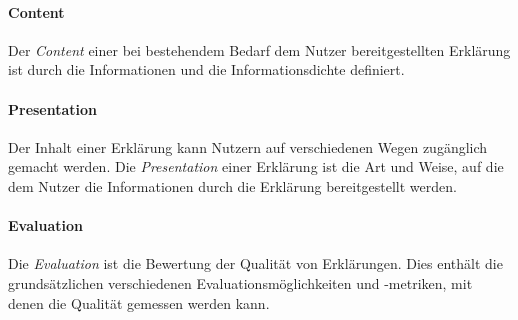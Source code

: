 \paragraph{Content} Der \textit{Content} einer bei bestehendem Bedarf dem Nutzer bereitgestellten Erklärung ist durch die Informationen und die Informationsdichte definiert.

\paragraph{Presentation} Der Inhalt einer Erklärung kann Nutzern auf verschiedenen Wegen zugänglich gemacht werden. Die \textit{Presentation} einer Erklärung ist die Art und Weise, auf die dem Nutzer die Informationen durch die Erklärung bereitgestellt werden.

\paragraph{Evaluation} Die \textit{Evaluation} ist die Bewertung der Qualität von Erklärungen. Dies enthält die grundsätzlichen verschiedenen Evaluationsmöglichkeiten und -metriken, mit denen die Qualität gemessen werden kann.



\newpage





